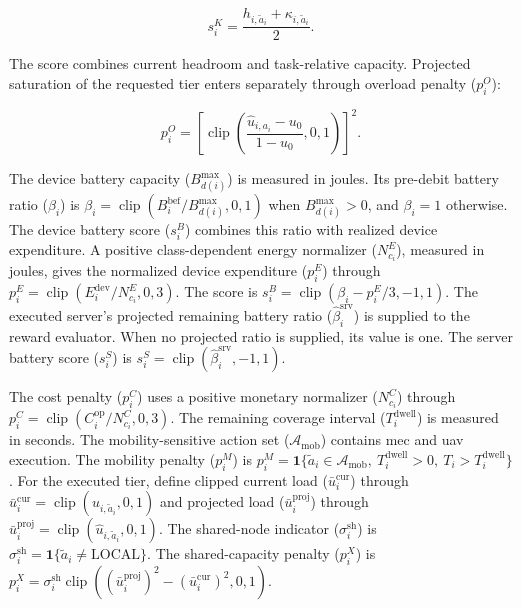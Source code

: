 \documentclass[journal]{IEEEtran}
\begin{document}
\begin{equation}
\label{eq:compute-adequacy}
s_i^{K}
=
\frac{
h_{i,\tilde a_i}
+
\kappa_{i,\tilde a_i}
}{2}.
\end{equation}

The score combines current headroom and task-relative capacity. Projected saturation of the requested tier enters separately through overload penalty (\(p_i^{O}\)):

\begin{equation}
\label{eq:overload-penalty}
p_i^{O}
=
\left[
\operatorname{clip}
\left(
\frac{\widehat u_{i,a_i}-u_0}{1-u_0},
0,1
\right)
\right]^2.
\end{equation}


The device battery capacity (\(B_{d(i)}^{\max}\)) is measured in joules. Its pre-debit battery ratio (\(\beta_i\)) is \(\beta_i=\operatorname{clip}(B_i^{\mathrm{bef}}/B_{d(i)}^{\max},0,1)\) when \(B_{d(i)}^{\max}>0\), and \(\beta_i=1\) otherwise. The device battery score (\(s_i^{B}\)) combines this ratio with realized device expenditure. A positive class-dependent energy normalizer (\(N_{c_i}^{E}\)), measured in joules, gives the normalized device expenditure (\(p_i^{E}\)) through \(p_i^{E}=\operatorname{clip}(E_i^{\mathrm{dev}}/N_{c_i}^{E},0,3)\). The score is \(s_i^{B}=\operatorname{clip}(\beta_i-p_i^{E}/3,-1,1)\). The executed server’s projected remaining battery ratio (\(\widehat\beta_i^{\mathrm{srv}}\)) is supplied to the reward evaluator. When no projected ratio is supplied, its value is one. The server battery score (\(s_i^{S}\)) is \(s_i^{S}=\operatorname{clip}(\widehat\beta_i^{\mathrm{srv}},-1,1)\).

The cost penalty (\(p_i^{C}\)) uses a positive monetary normalizer (\(N_{c_i}^{C}\)) through \(p_i^{C}=\operatorname{clip}(C_i^{\mathrm{op}}/N_{c_i}^{C},0,3)\). The remaining coverage interval (\(T_i^{\mathrm{dwell}}\)) is measured in seconds. The mobility-sensitive action set (\(\mathcal A_{\mathrm{mob}}\)) contains \acs{mec} and \acs{uav} execution. The mobility penalty (\(p_i^{M}\)) is \(p_i^{M}=\mathbf1\{\tilde a_i\in\mathcal A_{\mathrm{mob}},\ T_i^{\mathrm{dwell}}>0,\ T_i>T_i^{\mathrm{dwell}}\}\). For the executed tier, define clipped current load (\(\bar u_i^{\mathrm{cur}}\)) through \(\bar u_i^{\mathrm{cur}}=\operatorname{clip}(u_{i,\tilde a_i},0,1)\) and projected load (\(\bar u_i^{\mathrm{proj}}\)) through \(\bar u_i^{\mathrm{proj}}=\operatorname{clip}(\widehat u_{i,\tilde a_i},0,1)\). The shared-node indicator (\(\sigma_i^{\mathrm{sh}}\)) is \(\sigma_i^{\mathrm{sh}}=\mathbf1\{\tilde a_i\neq\mathrm{LOCAL}\}\). The shared-capacity penalty (\(p_i^{X}\)) is \(p_i^{X}=\sigma_i^{\mathrm{sh}}\operatorname{clip}((\bar u_i^{\mathrm{proj}})^2-(\bar u_i^{\mathrm{cur}})^2,0,1)\).
\end{document}
